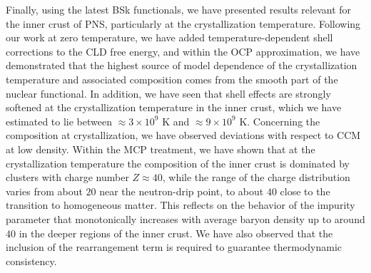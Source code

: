 Finally, using the latest BSk functionals, we have presented results relevant 
for the inner crust of PNS, particularly at the crystallization temperature.
Following our work at zero temperature, we have added temperature-dependent 
shell corrections to the CLD free energy, and within the OCP approximation, we 
have demonstrated that the highest source of model dependence of the 
crystallization temperature and associated composition comes from the smooth 
part of the nuclear functional. In addition, we have seen that shell 
effects are strongly softened at the crystallization temperature in the inner 
crust, which we have estimated to lie between $\approx 3\times 10^9$ K and 
$\approx 9\times 10^9$ K. 
Concerning the composition at crystallization, we have observed deviations with 
respect to CCM at low density. 
Within the MCP treatment, we have shown that at the crystallization temperature
the composition of the inner crust is dominated by clusters with charge number
$Z\approx 40$, while the range of the charge distribution varies from about 
$20$ near the neutron-drip point, to about $40$ close to the transition to
homogeneous matter.
This reflects on the behavior of the impurity parameter that monotonically 
increases with average baryon density up to around $40$ in the deeper regions 
of the inner crust.
We have also observed that the inclusion of the rearrangement term is required 
to guarantee thermodynamic consistency.

\clearpage\thispagestyle{empty}
